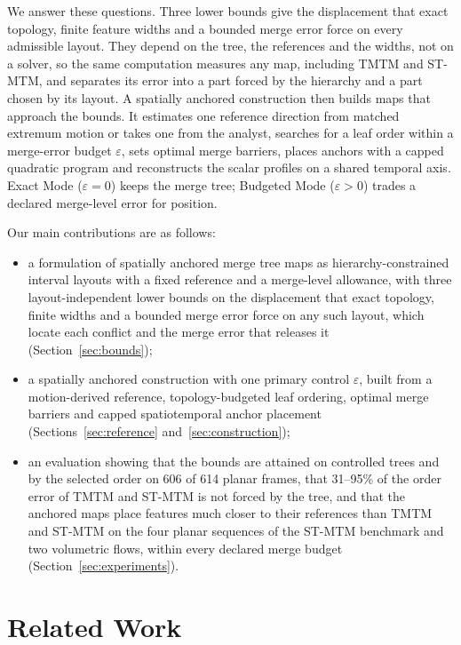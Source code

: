 \documentclass[review]{vgtc}
\begin{document}
We answer these questions. Three lower bounds give the displacement that exact topology, finite feature widths and a bounded merge error force on every admissible layout. They depend on the tree, the references and the widths, not on a solver, so the same computation measures any map, including TMTM and ST-MTM, and separates its error into a part forced by the hierarchy and a part chosen by its layout. A spatially anchored construction then builds maps that approach the bounds. It estimates one reference direction from matched extremum motion or takes one from the analyst, searches for a leaf order within a merge-error budget $\varepsilon$, sets optimal merge barriers, places anchors with a capped quadratic program and reconstructs the scalar profiles on a shared temporal axis. Exact Mode ($\varepsilon=0$) keeps the merge tree; Budgeted Mode ($\varepsilon>0$) trades a declared merge-level error for position.

Our main contributions are as follows:
\begin{itemize}
\setlength{\itemsep}{2pt}
\setlength{\parsep}{0pt}
\item a formulation of spatially anchored merge tree maps as hierarchy-constrained interval layouts with a fixed reference and a merge-level allowance, with three layout-independent lower bounds on the displacement that exact topology, finite widths and a bounded merge error force on any such layout, which locate each conflict and the merge error that releases it (Section~\ref{sec:bounds});
\item a spatially anchored construction with one primary control $\varepsilon$, built from a motion-derived reference, topology-budgeted leaf ordering, optimal merge barriers and capped spatiotemporal anchor placement (Sections~\ref{sec:reference} and~\ref{sec:construction});
\item an evaluation showing that the bounds are attained on controlled trees and by the selected order on 606 of 614 planar frames, that 31--95\% of the order error of TMTM and ST-MTM is not forced by the tree, and that the anchored maps place features much closer to their references than TMTM and ST-MTM on the four planar sequences of the ST-MTM benchmark and two volumetric flows, within every declared merge budget (Section~\ref{sec:experiments}).
\end{itemize}



\section{Related Work}\label{sec:related}
\end{document}
